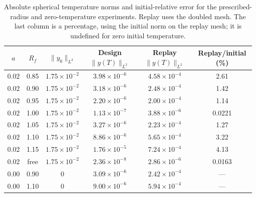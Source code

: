 \begin{table}[tbp]
\caption{Absolute spherical temperature norms and initial-relative error for the prescribed-radius and zero-temperature experiments. Replay uses the doubled mesh. The last column is a percentage, using the initial norm on the replay mesh; it is undefined for zero initial temperature.}
\label{tab:num_terminal_accuracy}
\centering\footnotesize\setlength{\tabcolsep}{4pt}
\begin{tabular}{cccccc}
\toprule
$a$ & $R_f$ & $\|y_0\|_{L^2}$ & Design $\|y(T)\|_{L^2}$ & Replay $\|y(T)\|_{L^2}$ & Replay/initial (\%)\\
\midrule
0.02 & 0.85 & $1.75\times10^{-2}$ & $3.98\times10^{-6}$ & $4.58\times10^{-4}$ & 2.61 \\
0.02 & 0.90 & $1.75\times10^{-2}$ & $3.18\times10^{-6}$ & $2.48\times10^{-4}$ & 1.42 \\
0.02 & 0.95 & $1.75\times10^{-2}$ & $2.20\times10^{-6}$ & $2.00\times10^{-4}$ & 1.14 \\
0.02 & 1.00 & $1.75\times10^{-2}$ & $1.13\times10^{-7}$ & $3.88\times10^{-6}$ & 0.0221 \\
0.02 & 1.05 & $1.75\times10^{-2}$ & $3.27\times10^{-6}$ & $2.23\times10^{-4}$ & 1.27 \\
0.02 & 1.10 & $1.75\times10^{-2}$ & $8.86\times10^{-6}$ & $5.65\times10^{-4}$ & 3.22 \\
0.02 & 1.15 & $1.75\times10^{-2}$ & $1.76\times10^{-5}$ & $7.24\times10^{-4}$ & 4.13 \\
0.02 & free & $1.75\times10^{-2}$ & $2.36\times10^{-8}$ & $2.86\times10^{-6}$ & 0.0163 \\
0.00 & 0.90 & $0$ & $3.09\times10^{-6}$ & $2.42\times10^{-4}$ & --- \\
0.00 & 1.10 & $0$ & $9.00\times10^{-6}$ & $5.94\times10^{-4}$ & --- \\
\bottomrule
\end{tabular}
\end{table}

